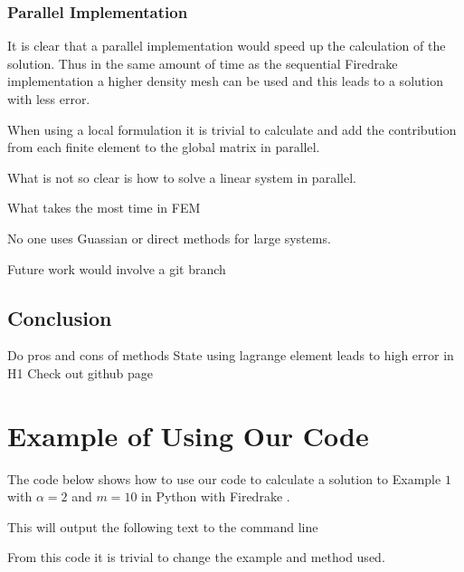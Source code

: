 \documentclass[12pt]{ociamthesis}
\begin{document}
\subsection{Parallel Implementation}
It is clear that a parallel implementation would speed up the calculation of the solution. Thus in the same amount of time as the sequential Firedrake implementation a higher density mesh can be used and this leads to a solution with less error.

When using a local formulation it is trivial to calculate and add the contribution from each finite element to the global matrix in parallel.

What is not so clear is how to solve a linear system in parallel. 

What takes the most time in FEM

No one uses Guassian or direct methods for large systems.

Future work would involve a git branch 

\section{Conclusion}
Do pros and cons of methods
State using lagrange element leads to high error in H1
Check out github page \cite{Hub}

\printbibliography[heading=bibintoc]

\appendix

\chapter{Example of Using Our Code}
The code below shows how to use our code to calculate a solution to Example $1$ with $\alpha=2$ and $m=10$ in Python with Firedrake \cite{Dragon}.

This will output the following text to the command line

From this code it is trivial to change the example and method used.
\end{document}
